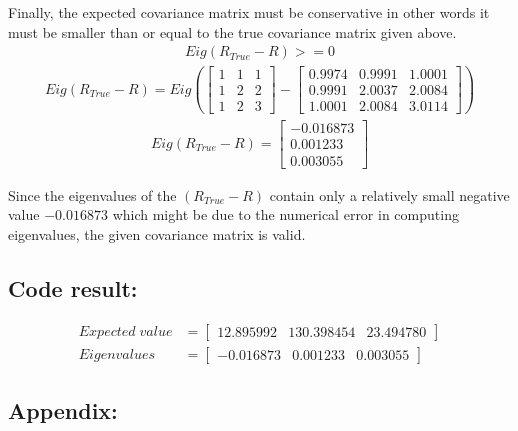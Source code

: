 \documentclass[a4paper]{article}
\begin{document}
Finally, the expected covariance matrix must be conservative in other words it must be smaller than or equal to the 
true covariance matrix given above.
\begin{align*}
\boxed{Eig(R_{True} - R) >= 0}
\end{align*}
\begin{align*}
Eig(R_{True} - R) = Eig\left(
	\begin{bmatrix}
		1 & 1 & 1 \\ 
		1 & 2 & 2 \\
		1 & 2 & 3
	\end{bmatrix}
	-
	\begin{bmatrix}
		0.9974  &  0.9991  &  1.0001 \\
    	0.9991  &  2.0037  &  2.0084 \\
    	1.0001  &  2.0084  &  3.0114
	\end{bmatrix}
\right)
\end{align*}
\begin{align*}
Eig(R_{True} - R) =
	\begin{bmatrix}
		-0.016873 \\
		0.001233 \\
		0.003055		
	\end{bmatrix}
\end{align*}

Since the eigenvalues of the $(R_{True} - R)$ contain only a relatively small negative value $-0.016873$ 
which might be due to the numerical error in computing eigenvalues, the given covariance matrix is valid.

\subsection*{Code result:}
\begin{align*}
	Expected \; value &= 
	\begin{bmatrix}
		12.895992 & 130.398454 & 23.494780
	\end{bmatrix} \\
	Eigenvalues &= 
	\begin{bmatrix}
		-0.016873 & 0.001233 & 0.003055
	\end{bmatrix}
\end{align*}

\newpage
\subsection*{Appendix:}

\end{document}
